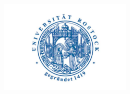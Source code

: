 \thispagestyle{empty}
\begin{titlepage}

  \condTWOSIDE{\changetext{}{19mm}{}{19mm}{}}
  
  \vspace{1cm}
  \begin{center}
    \includegraphics[width=6.5cm]{4.graphics/logo/uni_rostock_logo} \\ 
  \end{center}



  \begin{center}
    \vspace{0.07cm}
    
    \huge \textbf{\myUni}\\
    
    \vspace{0.4cm}
    
    \LARGE \myFaculty
  \end{center}
  \vfill
  \vfill
  \begin{center}
    \LARGE \textbf{\myTitle}
   \vspace{0.3cm}
  \end{center} 




\end{titlepage}
